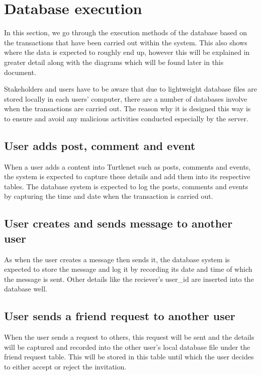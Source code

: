
\section{Database execution }
In this section, we go through the execution methods of the database based on the transactions that have been carried out within the system. This also shows where the data is expected to roughly end up, however this will be explained in greater detail along with the diagrams which will be found later in this document.

Stakeholders and users have to be aware that due to lightweight database files are stored locally in each users' computer, there are a number of databases involve when the transactions are carried out. The reason why it is designed this way is to ensure and avoid any malicious activities conducted especially by the server. 

\subsection{User adds post, comment and event}
When a user adds a content into Turtlenet such as posts, comments and events, the system is expected to capture these details and add them into its respective tables. The database system is expected to log the posts, comments and events by capturing the time and date when the transaction is carried out.

\subsection{User creates and sends message to another user}
As when the user creates a message then sends it, the database system is expected to store the message and log it by recording its date and time of which the message is sent. Other details like the reciever's user\_id are inserted into the database well.

\subsection{User sends a friend request to another user}
When the user sends a request to others, this request will be sent and the details will be captured and recorded into the other user's local database file under the friend request table. This will be stored in this table until which the user decides to either accept or reject the invitation.

